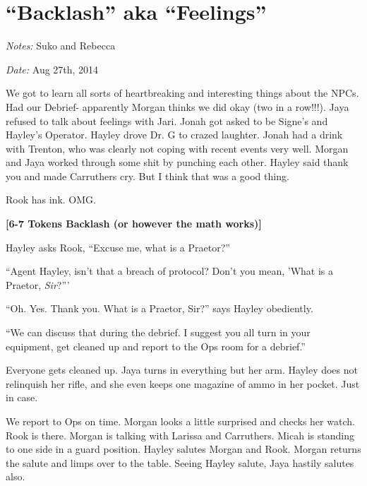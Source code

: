 \setcounter{chapter}{ 30 }
\chapter{\textbf{``Backlash'' aka ``Feelings''} }






\textit{Notes:} Suko and Rebecca

\textit{Date:} Aug 27th, 2014



We got to learn all sorts of heartbreaking and interesting things about the NPCs.  Had our Debrief- apparently Morgan thinks we did okay (two in a row!!!).  Jaya refused to talk about feelings with Jari.  Jonah got asked to be Signe's and Hayley's Operator.  Hayley drove Dr. G to crazed laughter.  Jonah had a drink with Trenton, who was clearly not coping with recent events very well.  Morgan and Jaya worked through some shit by punching each other.  Hayley said thank you and made Carruthers cry.  But I think that was a good thing.



Rook has ink.  OMG.






\textbf{{[}6-7 Tokens Backlash (or however the math works){]}}

Hayley asks Rook, ``Excuse me, what is a Praetor?''

``Agent Hayley, isn't that a breach of protocol?  Don't you mean, 'What is a Praetor, \textit{Sir}?'''

``Oh.  Yes.  Thank you.  What is a Praetor, Sir?'' says Hayley obediently.

``We can discuss that during the debrief.  I suggest you all turn in your equipment, get cleaned up and report to the Ops room for a debrief.''



Everyone gets cleaned up.  Jaya turns in everything but her arm.  Hayley does not relinquish her rifle, and she even keeps one magazine of ammo in her pocket.  Just in case.



We report to Ops on time.  Morgan looks a little surprised and checks her watch.  Rook is there.  Morgan is talking with Larissa and Carruthers.  Micah is standing to one side in a guard position.  Hayley salutes Morgan and Rook.  Morgan returns the salute and limps over to the table.  Seeing Hayley salute, Jaya hastily salutes also.



